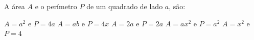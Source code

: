 A área $A$ e o perímetro $P$ de um quadrado de lado $a$, são:

$A=a^2$ e $P=4a$
$A=ab$ e $P=4x$
$A=2a$ e $P=2a$
$A=ax^2$ e $P=a^2$
$A=x^2$ e $P=4$



